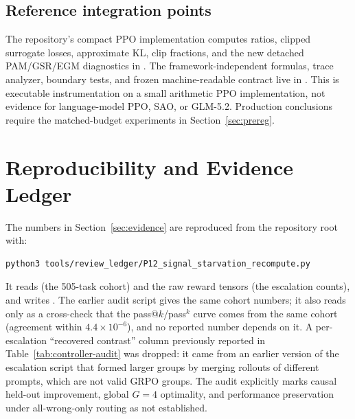 \documentclass{article}
\begin{document}
\subsection{Reference integration points}

The repository's compact PPO implementation computes ratios, clipped surrogate
losses, approximate KL, clip fractions, and the new detached PAM/GSR/EGM
diagnostics in
. The
framework-independent formulas, trace analyzer, boundary tests, and frozen
machine-readable contract live in
. This is executable
instrumentation on a small arithmetic PPO implementation, not evidence for
language-model PPO, SAO, or GLM-5.2. Production conclusions require the
matched-budget experiments in Section~\ref{sec:prereg}.

\section{Reproducibility and Evidence Ledger}
\label{app:ledger}

The numbers in Section~\ref{sec:evidence} are reproduced from the repository
root with:
\begin{verbatim}
python3 tools/review_ledger/P12_signal_starvation_recompute.py
\end{verbatim}
It reads
(the 505-task cohort) and the raw reward tensors
(the escalation counts), and writes
.
The earlier audit script
 gives the
same cohort numbers; it also reads
only as a cross-check that the pass@$k$/pass$^k$ curve comes from the same
cohort (agreement within $4.4\times10^{-6}$), and no reported number depends on
it.  A per-escalation ``recovered contrast'' column previously reported in
Table~\ref{tab:controller-audit} was dropped: it came from an earlier version
of the escalation script that formed larger groups by merging rollouts of
different prompts, which are not valid GRPO groups.  The audit explicitly
marks causal held-out improvement, global $G=4$ optimality, and performance
preservation under all-wrong-only routing as not established.
\end{document}
